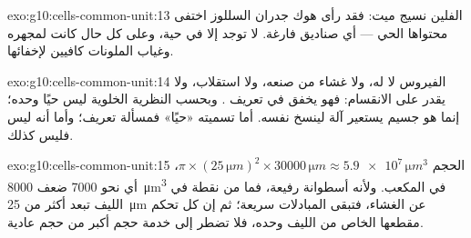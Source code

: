 \begin{solution}{exo:g10:cells-common-unit:13}
الفلين نسيج ميت: فقد رأى هوك جدران السللوز  اختفى محتواها الحي
--- أي صناديق فارغة.  لا توجد إلا في   حية، وعلى
كل حال كانت  لمجهره وغياب الملونات كافيين لإخفائها.
\end{solution}

\begin{solution}{exo:g10:cells-common-unit:14}
الفيروس لا  له، ولا غشاء من صنعه، ولا استقلاب، ولا يقدر على
الانقسام: فهو يخفق في تعريف . وبحسب النظرية الخلوية ليس حيًا
وحده؛ إنما هو جسيم يستعير آلة  لينسخ نفسه. أما تسميته «حيًا» فمسألة
تعريف؛ وأما أنه ليس  فليس كذلك.
\end{solution}

\begin{solution}{exo:g10:cells-common-unit:15}
الحجم $\pi \times (25\,\unit{\micro m})^2 \times 30000\,\unit{\micro m}
\approx \num{5.9e7}\,\unit{\micro m^3}$، أي نحو 7000 ضعف
\qty{8000}{\micro m^3} في المكعب. ولأنه أسطوانة رفيعة، فما من نقطة في
الليف تبعد أكثر من \qty{25}{\micro m} عن الغشاء، فتبقى المبادلات
سريعة؛ ثم إن كل  تحكم مقطعها الخاص من الليف وحده، فلا تضطر 
إلى خدمة حجم أكبر من حجم  عادية.
\end{solution}

